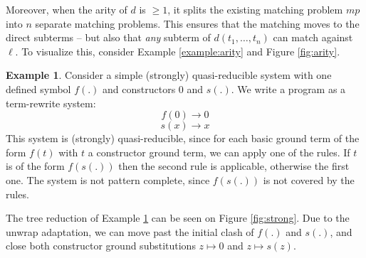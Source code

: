 \documentclass{report}
\theoremstyle{definition}
\newtheorem{example_inner}{Example}
\newenvironment{example}
  {\begin{customblock}\begin{example_inner}}
  {\end{example_inner}\end{customblock}}
\begin{document}
Moreover, when the arity of $d$ is $\geq 1$, it splits the existing matching problem $mp$ into $n$ separate matching problems. This ensures that the matching moves to the direct subterms – but also that \textit{any} subterm of $d(t_1,\dots,t_n)$ can match against $\ell$. To visualize this, consider Example \ref{example:arity} and Figure \ref{fig:arity}.

\begin{example}\label{example:strong} Consider a simple (strongly) quasi-reducible system with one defined symbol $f(.)$ and constructors $0$ and $s(.)$. We write a program as a term-rewrite system: 
$$f(0) \rightarrow 0$$
$$s(x) \rightarrow x$$
This system is (strongly) quasi-reducible, since for each basic ground term of the form $f(t)$ with $t$ a constructor ground term, we can apply one of the rules. If $t$ is of the form $f(s(.))$ then the second rule is applicable, otherwise the first one. The system is not pattern complete, since $f(s(.))$ is not covered by the rules.
\end{example}
The tree reduction of Example \ref{example:strong} can be seen on Figure \ref{fig:strong}. Due to the unwrap adaptation, we can move past the initial clash of $f(.)$ and $s(.)$, and close both constructor ground substitutions $z \mapsto 0$ and $z \mapsto s(z)$.
\end{document}

